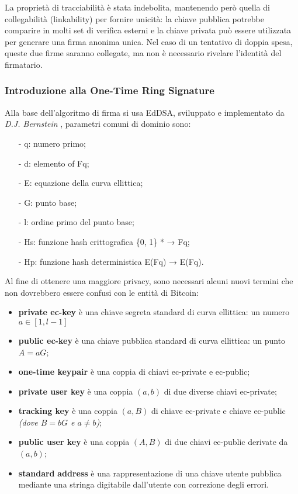 La proprietà di tracciabilità è stata indebolita, mantenendo però quella
di collegabilità (linkability) per fornire unicità: la chiave pubblica
potrebbe comparire in molti set di verifica esterni e la chiave privata
può essere utilizzata per generare una firma anonima unica. Nel caso di
un tentativo di doppia spesa, queste due firme saranno collegate, ma non
è necessario rivelare l'identità del firmatario.

\subsubsection{Introduzione alla One-Time Ring Signature}
Alla base dell'algoritmo di firma si usa EdDSA, sviluppato e
implementato da \emph{D.J. Bernstein} \cite{bernstein_et_al}, parametri comuni di
dominio sono: 
\begin{itemize}
  \item[-] q: numero primo; 
  \item[-] d: elemento of Fq; 
  \item[-] E: equazione della curva ellittica;
  \item[-] G: punto base; 
  \item[-] l: ordine primo del punto base; 
  \item[-] Hs: funzione hash crittografica \{0, 1\} * → Fq; 
  \item[-] Hp: funzione hash deterministica E(Fq) → E(Fq).
\end{itemize}

Al fine di ottenere una maggiore privacy, sono necessari alcuni nuovi
termini che non dovrebbero essere confusi con le entità di Bitcoin:

\begin{itemize}
  \item
    \textbf{private ec-key} è una chiave segreta standard di curva
    ellittica: un numero $a \in [1,l-1]$
  \item
    \textbf{public ec-key} è una chiave pubblica standard di curva
    ellittica: un punto $A=aG$;
  \item
    \textbf{one-time keypair} è una coppia di chiavi ec-private e
    ec-public;
  \item
    \textbf{private user key} è una coppia \emph{$(a, b)$} di due diverse
    chiavi ec-private;
  \item
    \textbf{tracking key} è una coppia \emph{$(a, B)$} di chiave ec-private
    e chiave ec-public \emph{(dove $B=bG$ e $a \neq b$)};
  \item
    \textbf{public user key} è una coppia \emph{$(A, B)$} di due chiavi
    ec-public derivate da \emph{$(a, b)$};
  \item
    \textbf{standard} \textbf{address} è una rappresentazione di una
    chiave utente pubblica mediante una stringa digitabile
    dall'utente con correzione degli errori.
  \end{itemize}

